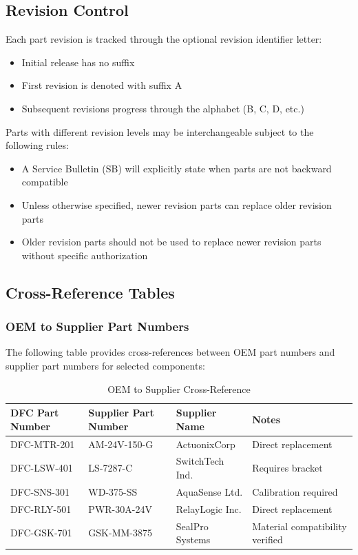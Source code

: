 \documentclass[12pt,a4paper,twoside,openright]{book}
\newcommand{\tabletextfont}{\normalfont\rmfamily}
\newcommand{\tableheadfont}{\normalfont\bfseries}
\begin{document}
\subsection{Revision Control}

Each part revision is tracked through the optional revision identifier letter:
\begin{itemize}
    \item Initial release has no suffix
    \item First revision is denoted with suffix A
    \item Subsequent revisions progress through the alphabet (B, C, D, etc.)
\end{itemize}

Parts with different revision levels may be interchangeable subject to the following rules:
\begin{itemize}
    \item A Service Bulletin (SB) will explicitly state when parts are not backward compatible
    \item Unless otherwise specified, newer revision parts can replace older revision parts
    \item Older revision parts should not be used to replace newer revision parts without specific authorization
\end{itemize}

\subsection{Cross-Reference Tables}

\subsubsection{OEM to Supplier Part Numbers}

The following table provides cross-references between OEM part numbers and supplier part numbers for selected components:

\begin{table}[h]
\centering
\setlength{\tabcolsep}{5pt} %
\begin{tabular}{|p{}|p{}|p{}|p{}|}
\hline
\tableheadfont\textbf{DFC Part Number} & \tableheadfont\textbf{Supplier Part Number} & \tableheadfont\textbf{Supplier Name} & \tableheadfont\textbf{Notes} \\
\hline
\tabletextfont DFC-MTR-201 & AM-24V-150-G & ActuonixCorp & Direct replacement \\
\hline
\tabletextfont DFC-LSW-401 & LS-7287-C & SwitchTech Ind. & Requires bracket \\
\hline
\tabletextfont DFC-SNS-301 & WD-375-SS & AquaSense Ltd. & Calibration required \\
\hline
\tabletextfont DFC-RLY-501 & PWR-30A-24V & RelayLogic Inc. & Direct replacement \\
\hline
\tabletextfont DFC-GSK-701 & GSK-MM-3875 & SealPro Systems & Material compatibility verified \\
\hline
\end{tabular}
\caption{OEM to Supplier Cross-Reference}
\end{table}
\end{document}
